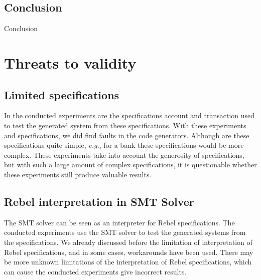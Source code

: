 


\subsection{Conclusion}
Conclusion

\section{Threats to validity}

\subsection*{Limited specifications}
In the conducted experiments are the specifications account and transaction used
to test the generated system from these specifications. With these experiments
and specifications, we did find faults in the code generators. Although are
these specifications quite simple, \textit{e.g.}, for a bank these
specifications would be more complex. These experiments take into account the
generosity of specifications, but with such a large amount of complex
specifications, it is questionable whether these experiments still produce
valuable results.

\subsection*{Rebel interpretation in SMT Solver}
The SMT solver can be seen as an interpreter for Rebel specifications. The
conducted experiments use the SMT solver to test the generated systems from the
specifications. We already discussed before the limitation of interpretation of
Rebel specifications, and in some cases, workarounds have been used. There may
be more unknown limitations of the interpretation of Rebel specifications, which
can cause the conducted experiments give incorrect results.


